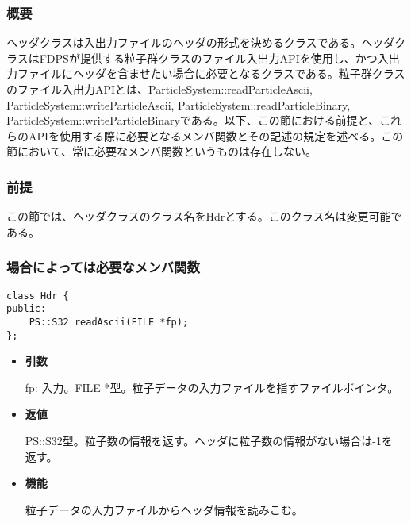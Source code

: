 \subsubsection{概要}

ヘッダクラスは入出力ファイルのヘッダの形式を決めるクラスである。ヘッダクラスはFDPSが提供する粒子群クラスのファイル入出力APIを使用し、かつ入出力ファイルにヘッダを含ませたい場合に必要となるクラスである。粒子群クラスのファイル入出力APIとは、ParticleSystem::readParticleAscii, ParticleSystem::writeParticleAscii, ParticleSystem::readParticleBinary, ParticleSystem::writeParticleBinaryである。以下、この節における前提と、これらのAPIを使用する際に必要となるメンバ関数とその記述の規定を述べる。この節において、常に必要なメンバ関数というものは存在しない。

\subsubsection{前提}

この節では、ヘッダクラスのクラス名をHdrとする。このクラス名は変更可能である。

\subsubsection{場合によっては必要なメンバ関数}

\label{sec:Hdr_readAscii}

\begin{screen}
\begin{verbatim}
class Hdr {
public:
    PS::S32 readAscii(FILE *fp);
};
\end{verbatim}
\end{screen}

\begin{itemize}

\item {\bf 引数}

  fp: 入力。FILE *型。粒子データの入力ファイルを指すファイルポインタ。
  
\item {\bf 返値}

  PS::S32型。粒子数の情報を返す。ヘッダに粒子数の情報がない場合は-1を
  返す。
  
\item {\bf 機能}

  粒子データの入力ファイルからヘッダ情報を読みこむ。
  
\end{itemize}


